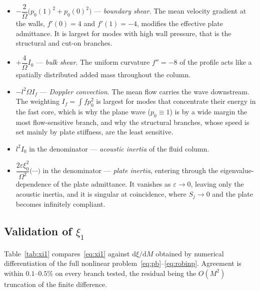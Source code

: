 \documentclass[11pt,a4paper]{article}
\newcommand{\Om}{\Omega}
\newcommand{\eps}{\varepsilon}
\newcommand{\dd}{\mathrm{d}}
\theoremstyle{plain}
\theoremstyle{remark}
\begin{document}
\begin{itemize}[leftmargin=1.6em,itemsep=2pt]
\item $-\dfrac{2}{\Om}\bigl(p_0(1)^2+p_0(0)^2\bigr)$ --- \emph{boundary shear}. The mean velocity
gradient at the walls, $f'(0)=4$ and $f'(1)=-4$, modifies the effective plate admittance. It is
largest for modes with high wall pressure, that is the structural and cut-on branches.

\item $+\dfrac{4}{\Om}I_0$ --- \emph{bulk shear}. The uniform curvature $f''=-8$ of the profile acts
like a spatially distributed added mass throughout the column.

\item $-l^2\Om I_f$ --- \emph{Doppler convection}. The mean flow carries the wave downstream. The
weighting $I_f=\int f p_0^2$ is largest for modes that concentrate their energy in the fast core, which
is why the plane wave ($p_0\equiv1$) is by a wide margin the most flow-sensitive branch, and why the
structural branches, whose speed is set mainly by plate stiffness, are the least sensitive.

\item $l^2I_0$ in the denominator --- \emph{acoustic inertia} of the fluid column.

\item $\dfrac{2\eps\xi_0^2}{\Om^2}\bigl(\cdots\bigr)$ in the denominator --- \emph{plate inertia},
entering through the eigenvalue-dependence of the plate admittance. It vanishes as $\eps\to0$, leaving
only the acoustic inertia, and it is singular at coincidence, where $S_j\to0$ and the plate becomes
infinitely compliant.
\end{itemize}

\subsection{Validation of $\xi_1$}
Table~\ref{tab:xi1} compares~\eqref{eq:xi1} against $\dd\xi/\dd M$ obtained by numerical
differentiation of the full nonlinear problem~\eqref{eq:pb}--\eqref{eq:robinp}. Agreement is within
$0.1$--$0.5\%$ on every branch tested, the residual being the $O(M^2)$ truncation of the finite
difference.
\end{document}
